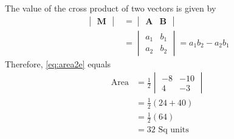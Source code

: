 \documentclass[12pt]{article}
\newcommand{\mydet}[1]{\ensuremath{\begin{vmatrix}#1\end{vmatrix}}}
\providecommand{\brak}[1]{\ensuremath{\left(#1\right)}}
\let\vec\mathbf
\begin{document}
\begin{enumerate}
\begin{enumerate}
The value of the cross product of two vectors is given by
\begin{align}
  \label{eq:det2e}
  \mydet{\vec{M}} &= \mydet{\vec{A} & \vec{B}} 
  \\
  &= \mydet{a_1 & b_1\\a_2 & b_2} = a_1b_2 - a_2 b_1
\end{align}
		Therefore, \eqref{eq:area2e} equals \\
\begin{align}
\text{Area} &=	\frac{1}{2}\mydet{-8 & -10\\4 & -3}  \\
	&=	\frac{1}{2}\brak{24+40}  \\
	&=  \frac{1}{2}\brak{64}  \\ 
	&=  32 \text{ Sq units}		       
\end{align}

\end{enumerate}


\end{enumerate}
\end{document}
